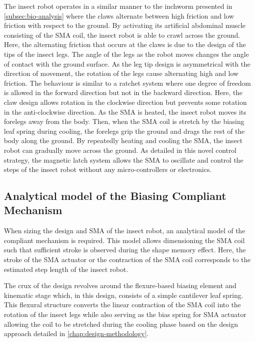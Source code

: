 The insect robot operates in a similar manner to the inchworm presented in \cref{subsec:bio-analysis} where the claws alternate between high friction and low friction with respect to the ground. By activating its artificial abdominal muscle consisting of the SMA coil, the insect robot is able to crawl across the ground. Here, the alternating friction that occurs at the claws is due to the design of the tips of the insect legs. The angle of the legs as the robot moves changes the angle of contact with the ground surface. As the leg tip design is asymmetrical with the direction of movement, the rotation of the legs cause alternating high and low friction. The behaviour is similar to a ratchet system where one degree of freedom is allowed in the forward direction but not in the backward direction. Here, the claw design allows rotation in the clockwise direction but prevents some rotation in the anti-clockwise direction. As the SMA is heated, the insect robot moves its forelegs away from the body. Then, when the SMA coil is stretch by the biasing leaf spring during cooling, the forelegs grip the ground and drags the rest of the body along the ground. By repeatedly heating and cooling the SMA, the insect robot can gradually move across the ground. As detailed in this novel control strategy, the magnetic latch system allows the SMA to oscillate and control the steps of the insect robot without any micro-controllers or electronics.

\subsection{Analytical model of the Biasing Compliant Mechanism}

When sizing the design and SMA of the insect robot, an analytical model of the compliant mechanism is required. This model allows dimensioning the SMA coil such that sufficient stroke is observed during the shape memory effect. Here, the stroke of the SMA actuator or the contraction of the SMA coil corresponds to the estimated step length of the insect robot.

The crux of the design revolves around the flexure-based biasing element and kinematic stage which, in this design, consists of a simple cantilever leaf spring. This flexural structure converts the linear contraction of the SMA coil into the rotation of the insect legs while also serving as the bias spring for SMA actuator allowing the coil to be stretched during the cooling phase based on the design approach detailed in \cref{chap:design-methodology}.

